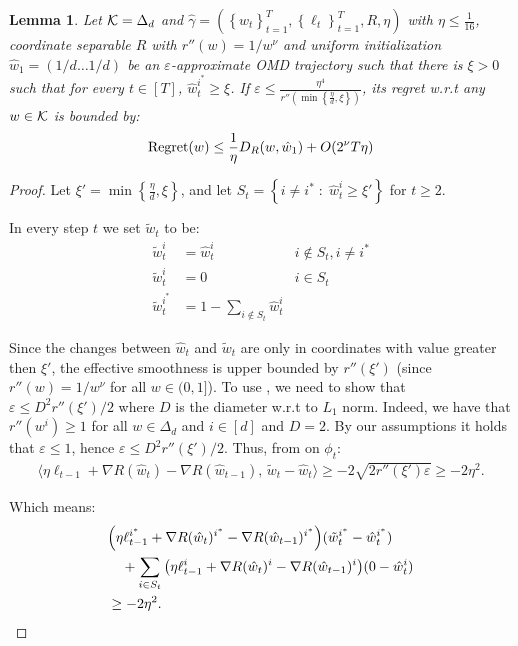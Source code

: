 \documentclass[10pt]{article}
\newtheorem{lemma}[theorem]{Lemma}
\theoremstyle{definition}
\theoremstyle{remark}
\renewcommand{\epsilon}{\varepsilon}
\newcommand\inprod[2]{\langle #1,\,#2 \rangle}
\newcommand{\curly}[1]{ {\left\{ #1 \right\}}}
\newcommand{\roundy}[1]{ {\left( #1 \right)}}
\newcommand{\barconst}{\nu}
\newcommand{\reg}{{\rm Regret}}
\begin{document}
\begin{lemma} \label{lem:LB best UB regret}
Let $\mathcal K=\Delta_d$ and $\hat{\gamma}=(\curly{\hat{w}_t}_{t=1}^T, \curly{\ell_t}_{t=1}^T, R, \eta)$ with $\eta \le \frac{1}{16}$, coordinate separable $R$ with $r''(w) = 1/w^\barconst$ and uniform initialization $\hat{w}_1=(1/d\dots1/d)$ be an $\epsilon$-approximate OMD trajectory such that there is $\xi>0$ such that for every $t\in[T]$, $\hat{w}_t^{i^*}\ge\xi$. If $\epsilon \le \frac{\eta^4}{r''\roundy{\min\curly{\frac{\eta}{d}, \xi}}}$, its regret w.r.t any $w\in\mathcal K$ is bounded by:
\begin{align*}
    \reg(w) \le \frac{1}{\eta}D_R(w,\hat{w}_1) + O(2^\barconst T\eta)
\end{align*}
\end{lemma}
\begin{proof}
Let $\xi'=\min\curly{\frac{\eta}{d}, \xi}$, and let $S_t = \curly{i\ne i^*\;\colon\;\hat{w}_t^i \ge \xi'}$ for $t \ge 2$.

In every step $t$ we set $\tilde{w}_t$ to be:
\begin{align*}
    \tilde{w}_t^i &= \hat{w}_t^i &i\notin S_t,i\ne i^* \\
    \tilde{w}_t^i &= 0 &i\in S_t \\
    \tilde{w}_t^{i^*} &= 1-\sum_{i\notin S_t 
    }\hat{w}_t^i
\end{align*}

Since the changes between $\hat{w}_t$ and $\tilde{w}_t$ are only in coordinates with value greater then $\xi'$, the effective smoothness is upper bounded by $r''(\xi')$ (since $r''(w) = 1/w^\barconst$ for all $w\in(0,1]$). To use , we need to show that $\epsilon \le D^2r''(\xi') /2$ where $D$ is the diameter w.r.t to $L_1$ norm. Indeed, we have that $r''(w^i) \ge 1$ for all $w\in \Delta_d$ and $i\in[d]$ and $D=2$. By our assumptions it holds that $\epsilon \le 1$, hence $\epsilon \le D^2r''(\xi')/2$. Thus, from  on $\phi_t$:
\begin{align*}
    \inprod{\eta\ell_{t-1} + \nabla R(\hat{w}_{t}) - \nabla R(\hat{w}_{t-1})}{\tilde{w}_t - \hat{w}_t} \ge -2\sqrt{2r''(\xi')\epsilon} \ge -2\eta^2.
\end{align*}

Which means:
\begin{align}
&\roundy{\eta\ell_{t-1}^{i^*} +  \nabla R(\hat{w}_{t})^{i^*} - \nabla R(\hat{w}_{t-1})^{i^*}}(\tilde{w}_t^{i^*} - \hat{w}_t^{i^*}) \notag\\
&\quad + \sum_{i\in S_t}\roundy{\eta\ell_{t-1}^{i} +  \nabla R(\hat{w}_{t})^{i} - \nabla R(\hat{w}_{t-1})^{i}}(0 - \hat{w}_t^{i}) \notag\\
&\ge -2\eta^2.\label{eq:optimality on S}
\end{align}


\end{proof}
\end{document}
